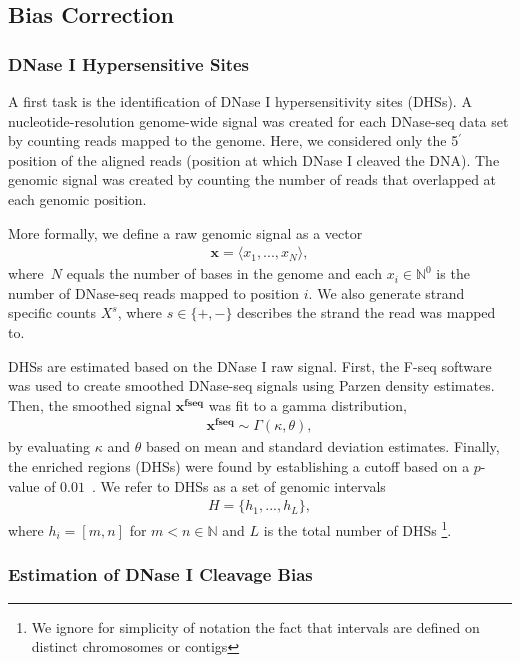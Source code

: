 \documentclass[11pt]{article}
\begin{document}
\subsection{Bias Correction}
\label{sec:cleavage-bias}

\subsubsection{DNase I Hypersensitive Sites}
\label{sec:signal}

A first task is the identification of DNase I hypersensitivity sites (DHSs). A nucleotide-resolution genome-wide signal was created for each DNase-seq data set by counting reads mapped to the genome. Here, we considered only the 5$^\prime$ position of the aligned reads (position at which DNase I cleaved the DNA). The genomic signal was created by counting the number of reads that overlapped at each genomic position.

More formally, we define a raw genomic signal as a vector
\begin{align*}
  \mathbf{x} = \langle{x}_{1},...,{x}_{N}\rangle,
\end{align*}
where~$N$ equals the number of bases in the genome and each ${x}_{i} \in \mathbb{N}^0$ is the number of DNase-seq reads mapped to position $i$. We also generate strand specific counts $X^s$, where $s \in \{+,-\}$ describes the strand the read was mapped to.

DHSs are estimated based on the DNase I raw signal. First, the F-seq software~\citep{boyle2008b} was used to create smoothed DNase-seq signals using Parzen density estimates. Then, the smoothed signal $\mathbf{x^\text{fseq}}$ was fit to a gamma distribution,
\begin{align*}
  \mathbf{x^\text{fseq}} \sim \Gamma(\kappa,\theta),
\end{align*}
by evaluating $\kappa$ and $\theta$ based on mean and standard deviation estimates. Finally, the enriched regions (DHSs) were found by establishing a cutoff based on a $p$-value of $0.01$~\citep{boyle2008b}. We refer to DHSs as a set of genomic intervals
\begin{align*}
  H = \{{h}_{1}, ..., {h}_{L}\},
\end{align*}
where ${h}_{i} = [m,n]$ for $m<n \in \mathbb{N}$ and $L$ is the total number of DHSs \footnote{We ignore for simplicity of notation the fact that intervals are defined on distinct chromosomes or contigs}.

\subsubsection{Estimation of DNase I Cleavage Bias}
\label{sec:bias-estimation}
\end{document}
